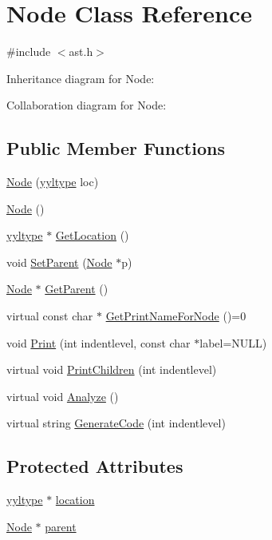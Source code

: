 \hypertarget{class_node}{}\section{Node Class Reference}
\label{class_node}


{\ttfamily \#include $<$ast.\+h$>$}



Inheritance diagram for Node\+:


Collaboration diagram for Node\+:
\subsection*{Public Member Functions}
\begin{DoxyCompactItemize}
\item 
\hyperlink{class_node_ae1a193c43abc2eea6d7c12e8eff40312}{Node} (\hyperlink{structyyltype}{yyltype} loc)
\item 
\hyperlink{class_node_ad7a34779cad45d997bfd6d3d8043c75f}{Node} ()
\item 
\hyperlink{structyyltype}{yyltype} $\ast$ \hyperlink{class_node_a4cdeb731db84c3787e77be957f9474a1}{Get\+Location} ()
\item 
void \hyperlink{class_node_ac8f490bfdc412494ac4793e36ecf3a16}{Set\+Parent} (\hyperlink{class_node}{Node} $\ast$p)
\item 
\hyperlink{class_node}{Node} $\ast$ \hyperlink{class_node_a3c762d37b1cad8d617db9620784da897}{Get\+Parent} ()
\item 
virtual const char $\ast$ \hyperlink{class_node_a56e29657306ffb004d69c6929ae44269}{Get\+Print\+Name\+For\+Node} ()=0
\item 
void \hyperlink{class_node_a9ef727fd72d1a37792b3db60a8a479dd}{Print} (int indentlevel, const char $\ast$label=N\+U\+LL)
\item 
virtual void \hyperlink{class_node_a3e67ec8d22182b721717af14fe0c3000}{Print\+Children} (int indentlevel)
\item 
virtual void \hyperlink{class_node_a5f88d55c6f253a29def7ccc443d83d47}{Analyze} ()
\item 
virtual string \hyperlink{class_node_acb60e526730e8436056375a3055c2c32}{Generate\+Code} (int indentlevel)
\end{DoxyCompactItemize}
\subsection*{Protected Attributes}
\begin{DoxyCompactItemize}
\item 
\hyperlink{structyyltype}{yyltype} $\ast$ \hyperlink{class_node_aa4d56e7ecdd3fd9c483b2309af3e9abf}{location}
\item 
\hyperlink{class_node}{Node} $\ast$ \hyperlink{class_node_ad8184598cdea70e4bbdfd76f2b0f9e85}{parent}
\end{DoxyCompactItemize}


